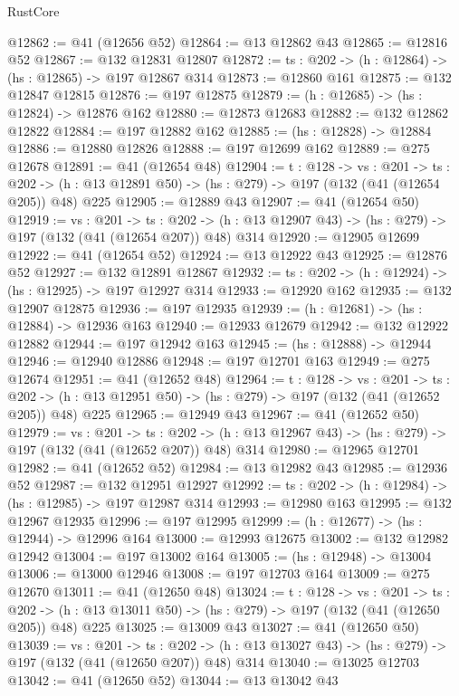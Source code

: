 \begin{lexlean}{RustCore}
\begin{coremodule}
@12862 := @41 (@12656 @52)
@12864 := @13 @12862 @43
@12865 := @12816 @52
@12867 := @132 @12831 @12807
@12872 := {ts : @202} -> (h : @12864) -> (hs : @12865) -> @197 @12867 @314
@12873 := @12860 @161
@12875 := @132 @12847 @12815
@12876 := @197 @12875
@12879 := (h : @12685) -> (hs : @12824) -> @12876 @162
@12880 := @12873 @12683
@12882 := @132 @12862 @12822
@12884 := @197 @12882 @162
@12885 := (hs : @12828) -> @12884
@12886 := @12880 @12826
@12888 := @197 @12699 @162
@12889 := @275 @12678
@12891 := @41 (@12654 @48)
@12904 := {t : @128} ->
  {vs : @201} ->
  {ts : @202} -> (h : @13 @12891 @50) -> (hs : @279) -> @197 (@132 (@41 (@12654 @205)) @48) @225
@12905 := @12889 @43
@12907 := @41 (@12654 @50)
@12919 := {vs : @201} ->
  {ts : @202} -> (h : @13 @12907 @43) -> (hs : @279) -> @197 (@132 (@41 (@12654 @207)) @48) @314
@12920 := @12905 @12699
@12922 := @41 (@12654 @52)
@12924 := @13 @12922 @43
@12925 := @12876 @52
@12927 := @132 @12891 @12867
@12932 := {ts : @202} -> (h : @12924) -> (hs : @12925) -> @197 @12927 @314
@12933 := @12920 @162
@12935 := @132 @12907 @12875
@12936 := @197 @12935
@12939 := (h : @12681) -> (hs : @12884) -> @12936 @163
@12940 := @12933 @12679
@12942 := @132 @12922 @12882
@12944 := @197 @12942 @163
@12945 := (hs : @12888) -> @12944
@12946 := @12940 @12886
@12948 := @197 @12701 @163
@12949 := @275 @12674
@12951 := @41 (@12652 @48)
@12964 := {t : @128} ->
  {vs : @201} ->
  {ts : @202} -> (h : @13 @12951 @50) -> (hs : @279) -> @197 (@132 (@41 (@12652 @205)) @48) @225
@12965 := @12949 @43
@12967 := @41 (@12652 @50)
@12979 := {vs : @201} ->
  {ts : @202} -> (h : @13 @12967 @43) -> (hs : @279) -> @197 (@132 (@41 (@12652 @207)) @48) @314
@12980 := @12965 @12701
@12982 := @41 (@12652 @52)
@12984 := @13 @12982 @43
@12985 := @12936 @52
@12987 := @132 @12951 @12927
@12992 := {ts : @202} -> (h : @12984) -> (hs : @12985) -> @197 @12987 @314
@12993 := @12980 @163
@12995 := @132 @12967 @12935
@12996 := @197 @12995
@12999 := (h : @12677) -> (hs : @12944) -> @12996 @164
@13000 := @12993 @12675
@13002 := @132 @12982 @12942
@13004 := @197 @13002 @164
@13005 := (hs : @12948) -> @13004
@13006 := @13000 @12946
@13008 := @197 @12703 @164
@13009 := @275 @12670
@13011 := @41 (@12650 @48)
@13024 := {t : @128} ->
  {vs : @201} ->
  {ts : @202} -> (h : @13 @13011 @50) -> (hs : @279) -> @197 (@132 (@41 (@12650 @205)) @48) @225
@13025 := @13009 @43
@13027 := @41 (@12650 @50)
@13039 := {vs : @201} ->
  {ts : @202} -> (h : @13 @13027 @43) -> (hs : @279) -> @197 (@132 (@41 (@12650 @207)) @48) @314
@13040 := @13025 @12703
@13042 := @41 (@12650 @52)
@13044 := @13 @13042 @43

\end{coremodule}
\end{lexlean}
